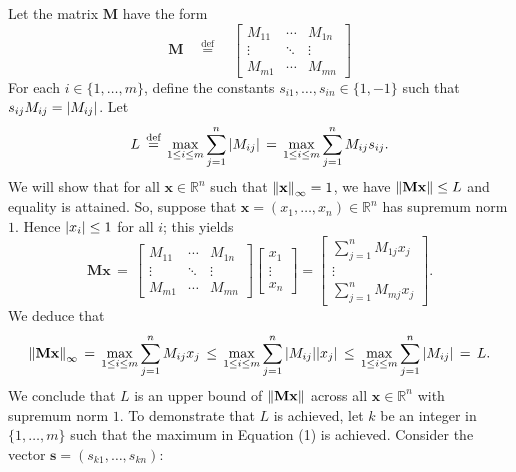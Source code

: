 \documentclass[11pt]{article}
\renewcommand{\vec}[1]{\mathbf{#1}}
\newcommand{\mat}[1]{\mathbf{#1}}
\begin{document}
Let the matrix $\mat{M}$ have the form
\[
  \mat{M} \quad \stackrel{\text{def}}{=} \quad \begin{bmatrix} M_{11} & \cdots & M_{1n} \\ \vdots & \ddots & \vdots \\ M_{m1} & \cdots & M_{mn} \end{bmatrix}
\]
For each $i \in \{ 1, \ldots, m \}$, define the constants $s_{i1}, \ldots, s_{in} \in \{ 1, -1 \}$ such that $s_{ij} M_{ij} = \abs{M_{ij}}$. Let 
\begin{equation}
  L \, \stackrel{\text{def}}{=} \, \max\limits_{1 \le i \le m} \sum\limits_{j = 1}^{n} \abs{M_{ij}} \, = \, \max\limits_{1 \le i \le m} \sum\limits_{j = 1}^{n} M_{ij}s_{ij}.
\end{equation}
We will show that for all $\vec{x} \in \mathbb{R}^{n}$ such that $\norm{\vec{x}}_{\infty} = 1$, we have $\norm{\mat{M}\vec{x}} \le L$ and equality is attained. So, suppose that $\vec{x} = (x_{1}, \ldots, x_{n}) \in \mathbb{R}^{n}$ has supremum norm $1$. Hence $\abs{x_{i}} \le 1$ for all $i$; this yields
\[
  \mat{M} \vec{x} \, = \, \begin{bmatrix} M_{11} & \cdots & M_{1n} \\ \vdots & \ddots & \vdots \\ M_{m1} & \cdots & M_{mn} \end{bmatrix} \begin{bmatrix} x_{1} \\ \vdots \\ x_{n} \end{bmatrix} = \begin{bmatrix} \sum\limits_{j = 1}^{n} M_{1j}x_{j} \\ \vdots \\ \sum\limits_{j = 1}^{n} M_{mj}x_{j} \end{bmatrix}.
\]
We deduce that
\begin{align*}
  \norm{\mat{M}\vec{x}}_{\infty} \, = \, \max\limits_{1 \le i \le m} \sum\limits_{j = 1}^{n}  M_{ij} x_{j} \, \le \, \max\limits_{1 \le i \le m} \sum\limits_{j = 1}^{n} \abs{M_{ij}} \abs{x_{j}} \, \le \, \max\limits_{1 \le i \le m} \sum\limits_{j = 1}^{n} \abs{M_{ij}} \, = \, L.
\end{align*}
We conclude that $L$ is an upper bound of $\norm{\mat{M}\vec{x}}$ across all $\vec{x} \in \mathbb{R}^{n}$ with supremum norm $1$. To demonstrate that $L$ is achieved, let $k$ be an integer in $\{ 1, \ldots, m \}$ such that the maximum in Equation (1) is achieved. Consider the vector $\vec{s} = (s_{k1}, \ldots, s_{kn})$:
\end{document}

